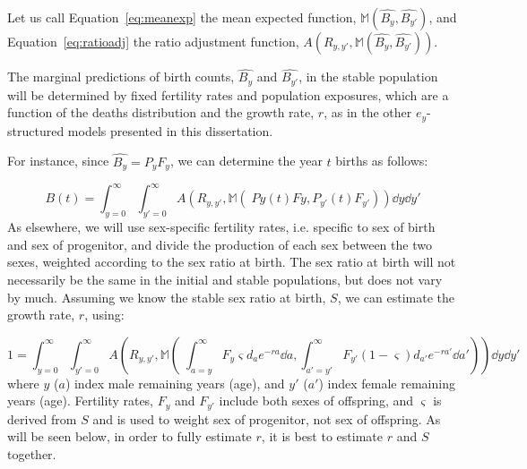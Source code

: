 Let us call Equation~\eqref{eq:meanexp} the mean
expected function, $\mathbb{M}(\widehat{B_y}, \widehat{B_{y'}})$, and
Equation~\eqref{eq:ratioadj} the ratio adjustment function, 
$A(R_{y,y'},\mathbb{M}(\widehat{B_y}, \widehat{B_{y'}}))$.

The marginal predictions of birth counts, $\widehat{B_y}$ and
$\widehat{B_{y'}}$, in the stable population will be determined by
fixed fertility rates and population exposures, which are a function of the
deaths distribution and the growth rate, $r$, as in the other $e_y$-structured 
models presented in this dissertation. 

For instance, since $\widehat{B_y} = P_yF_y$, we can determine the year $t$
births as follows:

\begin{equation}
\label{eq:ex2sexCRunity}
B(t) = \int_{y=0}^\infty \int_{y'=0}^\infty
A\left(R_{y,y'},\mathbb{M}\left(\;Py(t)Fy, P_{y'}(t)F_{y'} \right)\right) \dd y
\dd y'
\end{equation} 
As elsewhere, we will use sex-specific
fertility rates, i.e. specific to sex of birth and sex of progenitor, and divide
the production of each sex between the two sexes, weighted according to the sex
ratio at birth. The sex ratio at birth will not necessarily be the same in the
initial and stable populations, but does not vary by much. Assuming we know the
stable sex ratio at birth, $S$, we can estimate the growth rate, $r$, using:

\begin{equation}
\label{eq:ex2sexCRunity}
1 = \int_{y=0}^\infty \int_{y'=0}^\infty
A\left(R_{y,y'},\mathbb{M}\left(\;\int_{a=y}^\infty F_y \varsigma d_a
e^{-ra} \dd a, \int _{a'=y'}^\infty F_{y'} (1-\varsigma) d_{a'} e^{-ra'} \dd
a'\right)\right) \dd y
\dd y'
\end{equation} 
where $y$ ($a$) index male remaining years (age), and $y'$ ($a'$) index female
remaining years (age). Fertility rates, $F_y$ and $F_{y'}$ include both sexes of
offspring, and $\varsigma$ is derived from $S$ and is used to weight sex of
progenitor, not sex of offspring. As will be seen below, in order to fully estimate $r$, it is best
to estimate $r$ and $S$ together.

















